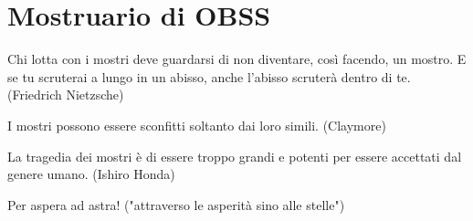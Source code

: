 \section{Mostruario di OBSS}

\begin{enfasi}{Chi lotta con i mostri deve guardarsi di non diventare, così facendo, un mostro. E se tu scruterai a lungo in un abisso, anche l'abisso scruterà dentro di te. (Friedrich Nietzsche)

\medskip

I mostri possono essere sconfitti soltanto dai loro simili. (Claymore)

\medskip

La tragedia dei mostri è di essere troppo grandi e potenti per essere accettati dal genere umano. (Ishiro Honda)

\medskip

Per aspera ad astra! ("attraverso le asperità sino alle stelle")

}\end{enfasi}

